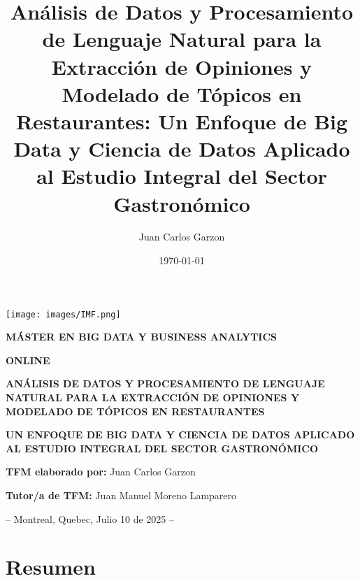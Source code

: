 \documentclass[12pt,a4paper,twoside,openany]{book}
\title{Análisis de Datos y Procesamiento de Lenguaje Natural para la Extracción de Opiniones y Modelado de Tópicos en Restaurantes: Un Enfoque de Big Data y Ciencia de Datos Aplicado al Estudio Integral del Sector Gastronómico}
\author{Juan Carlos Garzon}
\date{\today}
\begin{document}
\begin{titlepage}
\thispagestyle{empty}
\centering

\texttt{[image: images/IMF.png]}

\vspace{1cm}

\large
\textbf{MÁSTER EN BIG DATA Y BUSINESS ANALYTICS}

\textbf{ONLINE}

\vspace{1.5cm}

\LARGE
\textbf{\color{sectioncolor}ANÁLISIS DE DATOS Y PROCESAMIENTO DE LENGUAJE NATURAL PARA LA EXTRACCIÓN DE OPINIONES Y MODELADO DE TÓPICOS EN RESTAURANTES}

\vspace{0.8cm}

\Large
\textbf{\color{sectioncolor}UN ENFOQUE DE BIG DATA Y CIENCIA DE DATOS APLICADO AL ESTUDIO INTEGRAL DEL SECTOR GASTRONÓMICO}

\vspace{1.5cm}

\large
\textbf{TFM elaborado por:} Juan Carlos Garzon

\vspace{0.5cm}

\textbf{Tutor/a de TFM:} Juan Manuel Moreno Lamparero

\vfill

\large
-- Montreal, Quebec, Julio 10 de 2025 --

\end{titlepage}

\newpage
\thispagestyle{empty}
\mbox{}

\pagestyle{mainmatter}

\tableofcontents

\listoffigures

\listoftables



\chapter*{Resumen}
\end{document}
